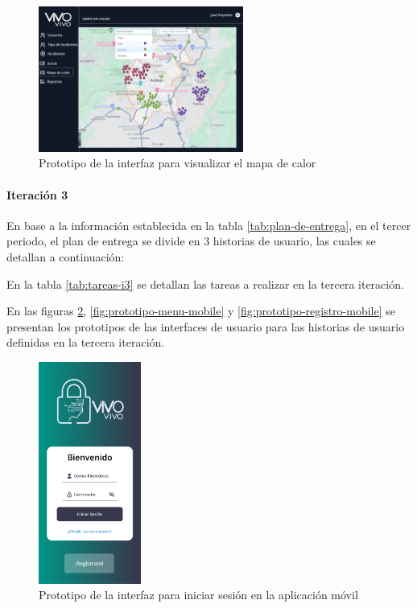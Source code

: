 \begin{figure}[H]
      \centering
      \includegraphics[width=0.6\textwidth]{chapters/III-resultados-y-discusion/resources/images/prototipo-mapa-de-calor-web.png}
      \caption{Prototipo de la interfaz para visualizar el mapa de calor}
      \label{fig:prototipo-interfaz-usuario-web-9}
\end{figure}

\paragraph{Iteración 3}

En base a la información establecida en la tabla \ref{tab:plan-de-entrega}, en el tercer periodo, el plan de
entrega se divide en 3 historias de usuario, las cuales se detallan a continuación:



En la tabla \ref{tab:tareas-i3} se detallan las tareas a realizar en la tercera iteración.



En las figuras \ref{fig:prototipo-inicio-sesion-mobile}, \ref{fig:prototipo-menu-mobile} y
\ref{fig:prototipo-registro-mobile} se presentan los prototipos de las interfaces de usuario para las historias de
usuario definidas en la tercera iteración.

\begin{figure}[H]
      \centering
      \includegraphics[width=0.3\textwidth]{chapters/III-resultados-y-discusion/resources/images/prototipo-inicio-sesion-mobile.png}
      \caption{Prototipo de la interfaz para iniciar sesión en la aplicación móvil}
      \label{fig:prototipo-inicio-sesion-mobile}
\end{figure}

